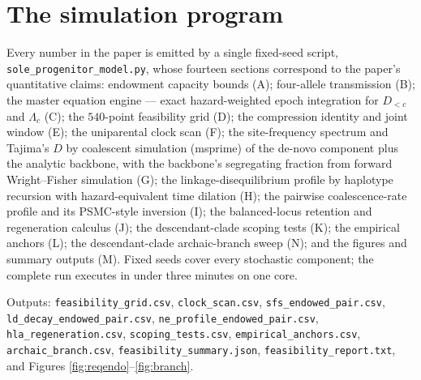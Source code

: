 \section{The simulation program}\label{sec:sims}
Every number in the paper is emitted by a single fixed-seed script,
\texttt{sole\_progenitor\_model.py}, whose fourteen sections correspond to
the paper's quantitative claims: endowment capacity bounds (A);
four-allele transmission (B); the master equation engine --- exact
hazard-weighted epoch integration for $D_{<c}$ and $\Lambda_c$ (C); the
$540$-point feasibility grid (D); the compression identity and joint
window (E); the uniparental clock scan (F); the site-frequency spectrum
and Tajima's $D$ by coalescent simulation (msprime) of the de-novo
component plus the analytic backbone, with the backbone's segregating
fraction from forward Wright--Fisher simulation (G); the
linkage-disequilibrium profile by haplotype recursion with
hazard-equivalent time dilation (H); the pairwise coalescence-rate profile
and its PSMC-style inversion (I); the balanced-locus retention and
regeneration calculus (J); the descendant-clade scoping tests (K); the
empirical anchors (L); the descendant-clade archaic-branch sweep (N); and
the figures and summary outputs (M). Fixed seeds cover every
stochastic component; the complete run executes in under three minutes on
one core. \begin{sloppypar}Outputs: \texttt{feasibility\_grid.csv},
\texttt{clock\_scan.csv}, \texttt{sfs\_endowed\_pair.csv},
\texttt{ld\_decay\_endowed\_pair.csv},
\texttt{ne\_profile\_endowed\_pair.csv},
\texttt{hla\_regeneration.csv}, \texttt{scoping\_tests.csv},
\texttt{empirical\_anchors.csv}, \texttt{archaic\_branch.csv},
\texttt{feasibility\_summary.json},
\texttt{feasibility\_report.txt}, and Figures
\ref{fig:reqendo}--\ref{fig:branch}.\end{sloppypar}
